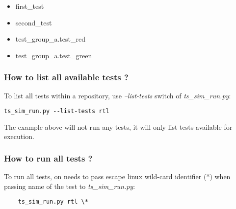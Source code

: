 \documentclass{tropic_design_spec}
\begin{document}
\begin{itemize}
    \item{first_test}
    \item{second_test}
    \item{test_group_a.test_red}
    \item{test_group_a.test_green}
\end{itemize}



\subsubsection{How to list all available tests ?}
\label{sec:how-to-list-all-available-tests}

To list all tests within a repository, use \textit{--list-tests} switch of
\textit{ts_sim_run.py}:

\begin{lstlisting}
ts_sim_run.py --list-tests rtl
\end{lstlisting}

The example above will not run any tests, it will only list tests available
for execution.


\subsubsection{How to run all tests ?}
\label{sec:how-to-run-all-tests}

To run all tests, on needs to pass escape linux wild-card identifier (*) when passing name
of the test to \textit{ts_sim_run.py}:

\begin{lstlisting}
    ts_sim_run.py rtl \*
\end{lstlisting}
\end{document}
